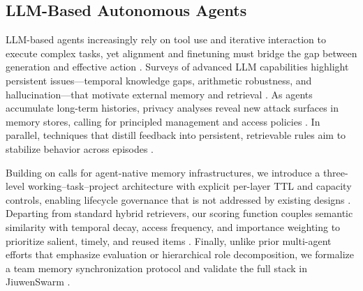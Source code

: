 \documentclass{article}
\begin{document}
\subsection{LLM-Based Autonomous Agents}
LLM-based agents increasingly rely on tool use and iterative interaction to execute complex tasks, yet alignment and finetuning must bridge the gap between generation and effective action \citep{wang2024learning}. Surveys of advanced LLM capabilities highlight persistent issues—temporal knowledge gaps, arithmetic robustness, and hallucination—that motivate external memory and retrieval \citep{roffo2024exploring}. As agents accumulate long-term histories, privacy analyses reveal new attack surfaces in memory stores, calling for principled management and access policies \citep{chen2026mrmmia}. In parallel, techniques that distill feedback into persistent, retrievable rules aim to stabilize behavior across episodes \citep{gallego2026distilling}.

Building on calls for agent-native memory infrastructures, we introduce a three-level working–task–project architecture with explicit per-layer TTL and capacity controls, enabling lifecycle governance that is not addressed by existing designs \citep{zhou2026we}. Departing from standard hybrid retrievers, our scoring function couples semantic similarity with temporal decay, access frequency, and importance weighting to prioritize salient, timely, and reused items \citep{sawarkar2024blended,ovcharov2026temporal}. Finally, unlike prior multi-agent efforts that emphasize evaluation or hierarchical role decomposition, we formalize a team memory synchronization protocol and validate the full stack in JiuwenSwarm \citep{rasheed2024large,rothfarb2025hierarchic}.


\end{document}
